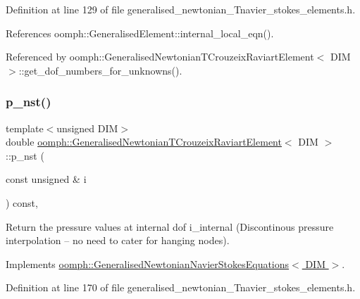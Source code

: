 Definition at line 129 of file generalised\+\_\+newtonian\+\_\+\+Tnavier\+\_\+stokes\+\_\+elements.\+h.



References oomph\+::\+Generalised\+Element\+::internal\+\_\+local\+\_\+eqn().



Referenced by oomph\+::\+Generalised\+Newtonian\+T\+Crouzeix\+Raviart\+Element$<$ D\+I\+M $>$\+::get\+\_\+dof\+\_\+numbers\+\_\+for\+\_\+unknowns().

\mbox{\label{classoomph_1_1GeneralisedNewtonianTCrouzeixRaviartElement_aacae104194ac35d57f2172372e0d90a5}} 
\subsubsection{\texorpdfstring{p\+\_\+nst()}{p\_nst()}\hspace{0.1cm}{\footnotesize\ttfamily [1/2]}}
{\footnotesize\ttfamily template$<$unsigned D\+IM$>$ \\
double \hyperlink{classoomph_1_1GeneralisedNewtonianTCrouzeixRaviartElement}{oomph\+::\+Generalised\+Newtonian\+T\+Crouzeix\+Raviart\+Element}$<$ D\+IM $>$\+::p\+\_\+nst (\begin{DoxyParamCaption}\item[{const unsigned \&}]{i }\end{DoxyParamCaption}) const\hspace{0.3cm}{\ttfamily [inline]}, {\ttfamily [virtual]}}



Return the pressure values at internal dof i\+\_\+internal (Discontinous pressure interpolation -- no need to cater for hanging nodes). 



Implements \hyperlink{classoomph_1_1GeneralisedNewtonianNavierStokesEquations_ae56b835810547b77405585b3a4091eec}{oomph\+::\+Generalised\+Newtonian\+Navier\+Stokes\+Equations$<$ D\+I\+M $>$}.



Definition at line 170 of file generalised\+\_\+newtonian\+\_\+\+Tnavier\+\_\+stokes\+\_\+elements.\+h.



